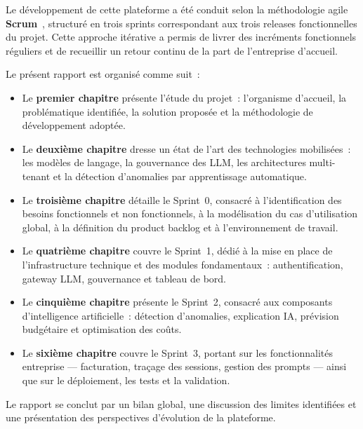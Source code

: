 \vspace{0.3cm}

Le développement de cette plateforme a été conduit selon la méthodologie agile \textbf{Scrum}~\cite{schwaber2020}, structuré en trois sprints correspondant aux trois releases fonctionnelles du projet. Cette approche itérative a permis de livrer des incréments fonctionnels réguliers et de recueillir un retour continu de la part de l'entreprise d'accueil.

\vspace{0.3cm}

Le présent rapport est organisé comme suit~:

\begin{itemize}[noitemsep]
    \item Le \textbf{premier chapitre} présente l'étude du projet~: l'organisme d'accueil, la problématique identifiée, la solution proposée et la méthodologie de développement adoptée.
    \item Le \textbf{deuxième chapitre} dresse un état de l'art des technologies mobilisées~: les modèles de langage, la gouvernance des LLM, les architectures multi-tenant et la détection d'anomalies par apprentissage automatique.
    \item Le \textbf{troisième chapitre} détaille le Sprint~0, consacré à l'identification des besoins fonctionnels et non fonctionnels, à la modélisation du cas d'utilisation global, à la définition du product backlog et à l'environnement de travail.
    \item Le \textbf{quatrième chapitre} couvre le Sprint~1, dédié à la mise en place de l'infrastructure technique et des modules fondamentaux~: authentification, gateway LLM, gouvernance et tableau de bord.
    \item Le \textbf{cinquième chapitre} présente le Sprint~2, consacré aux composants d'intelligence artificielle~: détection d'anomalies, explication IA, prévision budgétaire et optimisation des coûts.
    \item Le \textbf{sixième chapitre} couvre le Sprint~3, portant sur les fonctionnalités entreprise --- facturation, traçage des sessions, gestion des prompts --- ainsi que sur le déploiement, les tests et la validation.
\end{itemize}

Le rapport se conclut par un bilan global, une discussion des limites identifiées et une présentation des perspectives d'évolution de la plateforme.
